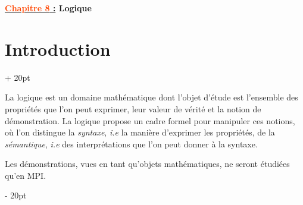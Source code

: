 \documentclass[a4paper, 12pt, twoside]{article}
\renewcommand{\emph}{\textcolor{ff4500}}
\newcommand{\ind}[1][20pt]{\advance\leftskip + #1}
\newcommand{\deind}[1][20pt]{\advance\leftskip - #1}
\newenvironment{indt}[2][20pt]{#2 \par \ind[#1]}{\par \deind} %
\newcommand{\thetitle}[2]{\begin{center}\textbf{{\LARGE \underline{\emph{#1} :}} {\Large #2}}\end{center}}
\begin{document}
    
    
    \thetitle{Chapitre 8}{Logique}
    
    \tableofcontents
    \newpage
    
    
    \begin{indt}{\section{Introduction}}
        
        La logique est un domaine mathématique dont l'objet d'étude est l'ensemble des propriétés que l'on peut exprimer, leur valeur de vérité et la notion de démonstration. La logique propose un cadre formel pour manipuler ces notions, où l'on distingue la \textit{syntaxe}, \textit{i.e} la manière d'exprimer les propriétés, de la \textit{sémantique}, \textit{i.e} des interprétations que l'on peut donner à la syntaxe.
        
        Les démonstrations, vues en tant qu'objets mathématiques, ne seront étudiées qu'en MPI.
        
    \end{indt}
    
    \vspace{12pt}
    
\end{document}
